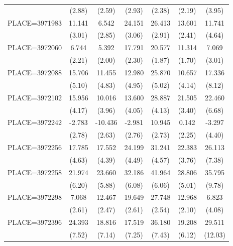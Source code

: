 {\begin{tabular}{l*{6}{c}}
                    &      (2.88)&      (2.59)&      (2.93)&      (2.38)&      (2.19)&      (3.95)\\
PLACE=3971983       &      11.141&       6.542&      24.151&      26.413&      13.601&      11.741\\
                    &      (3.01)&      (2.85)&      (3.06)&      (2.91)&      (2.41)&      (4.64)\\
PLACE=3972060       &       6.744&       5.392&      17.791&      20.577&      11.314&       7.069\\
                    &      (2.21)&      (2.00)&      (2.30)&      (1.87)&      (1.70)&      (3.01)\\
PLACE=3972088       &      15.706&      11.455&      12.980&      25.870&      10.657&      17.336\\
                    &      (5.10)&      (4.83)&      (4.95)&      (5.02)&      (4.14)&      (8.12)\\
PLACE=3972102       &      15.956&      10.016&      13.600&      28.887&      21.505&      22.460\\
                    &      (4.17)&      (3.96)&      (4.05)&      (4.13)&      (3.40)&      (6.68)\\
PLACE=3972242       &      -2.783&     -10.436&      -2.981&      10.945&       0.142&      -3.297\\
                    &      (2.78)&      (2.63)&      (2.76)&      (2.73)&      (2.25)&      (4.40)\\
PLACE=3972256       &      17.785&      17.552&      24.199&      31.241&      22.383&      26.113\\
                    &      (4.63)&      (4.39)&      (4.49)&      (4.57)&      (3.76)&      (7.38)\\
PLACE=3972258       &      21.974&      23.660&      32.186&      41.964&      28.806&      35.795\\
                    &      (6.20)&      (5.88)&      (6.08)&      (6.06)&      (5.01)&      (9.78)\\
PLACE=3972298       &       7.068&      12.467&      19.649&      27.748&      12.968&       6.823\\
                    &      (2.61)&      (2.47)&      (2.61)&      (2.54)&      (2.10)&      (4.08)\\
PLACE=3972396       &      24.393&      18.816&      17.519&      36.180&      19.208&      29.511\\
                    &      (7.52)&      (7.14)&      (7.25)&      (7.43)&      (6.12)&     (12.03)\\

\end{tabular}}

